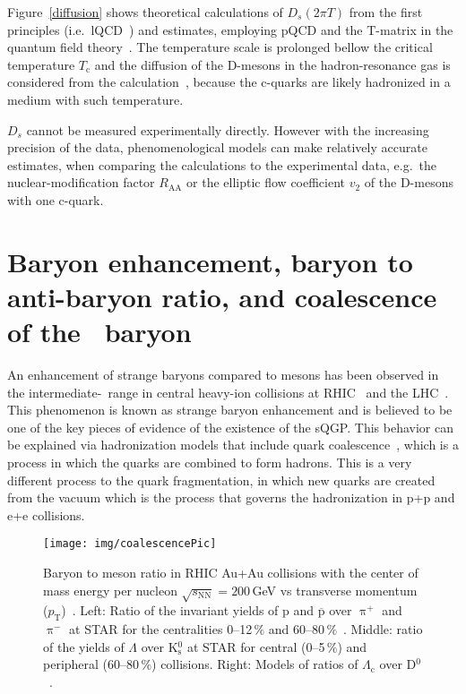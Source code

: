Figure~\ref{diffusion} shows theoretical calculations of $D_s(2\pi T)$ from the first principles (i.e.\ lQCD~\cite{BanerjeeLattice,DingLattice}) and estimates, employing pQCD and the T-matrix in the quantum field theory~\cite{Tmatrix}\@. The temperature scale is prolonged bellow the critical temperature $T_\mathrm{c}$ and the diffusion of the D-mesons in the hadron-resonance gas is considered from the calculation~\cite{DmesonHRG}, because the c-quarks are likely hadronized in a medium with such temperature.

$D_s$ cannot be  measured experimentally directly. However with the increasing precision of the data, phenomenological models can make relatively accurate estimates, when comparing the calculations to the experimental data, e.g.\ the nuclear-modification factor $R_\mathrm{AA}$ or the elliptic flow coefficient $v_2$ of the D-mesons with one c-quark\@.


\nocite{Langevin,LangevinTranslation}








\section{Baryon enhancement, baryon to anti-baryon ratio, and coalescence of the \Lambdac\ baryon}

An enhancement of strange baryons compared to mesons has been observed in the intermediate-\pt\ range in central heavy-ion collisions at RHIC~\cite{StrangenessEnhancementSTAR} and the LHC~\cite{LambdaALICE}\@. This phenomenon is known as strange baryon enhancement and is believed to be one of the key pieces of evidence of the existence of the sQGP\@. This behavior can be explained via hadronization models that include quark coalescence~\cite{coalescenceKrakow,coalescenceKFKI}, which is a process in which the quarks are combined to form hadrons. This is a very different process to the quark fragmentation, in which new quarks are created from the vacuum which is the process that governs the hadronization in p+p and e+e collisions.  

\begin{figure}[htb]
\centering
\texttt{[image: img/coalescencePic]}
\caption[Baryon to meson ratio in RHIC Au+Au collisions.]{\label{fig:LambdaKzero}Baryon to meson ratio in RHIC Au+Au collisions with the center of mass energy per nucleon $\sqrt{s_\mathrm{NN}} = 200\,$GeV vs transverse momentum ($p_\mathrm{T}$)~\cite{GuannanLc}\@. Left: Ratio of the invariant yields of p and $\overline{\mathrm{p}}$ over $\uppi^+$ and $\uppi^-$ at STAR for the centralities 0--12$\,\%$ and 60--80$\,\%$~\cite{StrangenessEnhancementSTAR}. Middle: ratio of the yields of $\Lambda$ over K$^0_\mathrm{s}$ at STAR for central (0--5$\,\%$) and peripheral (60--80$\,\%$) collisions. Right: Models of ratios of $\Lambda_\mathrm{c}$ over D$^0$~\cite{ShaoSong, Ghosh_Lc_rescattering, SHM}.}

\end{figure}

